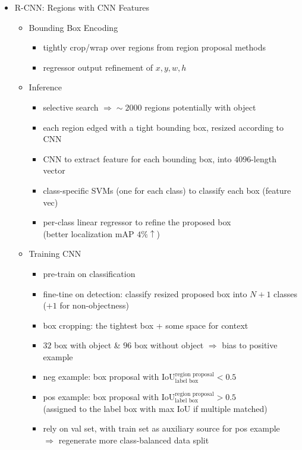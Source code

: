 \begin{itemize}
\item R-CNN: Regions with CNN Features
	\begin{itemize}
	\item Bounding Box Encoding
		\begin{itemize}
		\item tightly crop/wrap over regions from region proposal methods
		\item regressor output refinement of $x, y, w, h$
		\end{itemize}
	\item Inference
		\begin{itemize}
		\item selective search $\Rightarrow \sim 2000$ regions potentially with object
		\item each region edged with a tight bounding box, resized according to CNN
		\item CNN to extract feature for each bounding box, into $4096$-length vector
		\item class-specific SVMs (one for each class) to classify each box (feature vec)
		\item per-class linear regressor to refine the proposed box \\ 
		(better localization mAP $4\%\uparrow$)
		\end{itemize}
	\item Training CNN
		\begin{itemize}
		\item pre-train on classification
		\item fine-tine on detection: classify resized proposed box into $N+1$ classes \\
		($+1$ for non-objectness)
		\item box cropping: the tightest box + some space for context
		\item $32$ box with object \& $96$ box without object $\Rightarrow$ bias to positive example
		\item neg example: box proposal with $\text{IoU}^\text{region proposal}_\text{label box} < 0.5$
		\item pos example: box proposal with $\text{IoU}^\text{region proposal}_\text{label box} > 0.5$ \\
		(assigned to the label box with max IoU if multiple matched)
		\item rely on val set, with train set as auxiliary source for pos example \\
		$\Rightarrow$ regenerate more class-balanced data split \\

\end{itemize}
\end{itemize}
\end{itemize}
